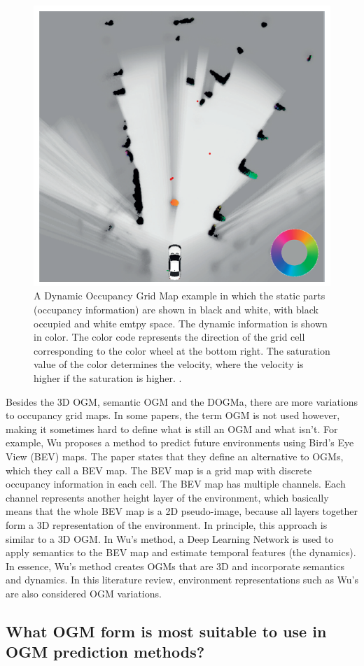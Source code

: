 \begin{figure}[h]
	\centering
	\includegraphics[width=0.4\linewidth]{Figures/Occupancy_Grid_Map/DOGMa_example}
	\caption{A Dynamic Occupancy Grid Map example in which the static parts (occupancy information) are shown in black and white, with black occupied and white emtpy space. The dynamic information is shown in color. The color code represents the direction of the grid cell corresponding to the color wheel at the bottom right. The saturation value of the color determines the velocity, where the velocity is higher if the saturation is higher. \cite{nuss2018random}.}
	\label{fig:DOGMa_example}
\end{figure}

Besides the 3D \gls{OGM}, semantic \gls{OGM} and the DOGMa, there are more variations to occupancy grid maps. In some papers, the term \gls{OGM} is not used however, making it sometimes hard to define what is still an \gls{OGM} and what isn't. 
For example, Wu \cite{wu2020motionnet} proposes a method to predict future environments using Bird's Eye View (BEV) maps. The paper states that they define an alternative to OGMs, which they call a BEV map. The BEV map is a grid map with discrete occupancy information in each cell. The BEV map has multiple channels. Each channel represents another height layer of the environment, which basically means that the whole BEV map is a 2D pseudo-image, because all layers together form a 3D representation of the environment. In principle, this approach is similar to a 3D \gls{OGM}. In Wu's method, a Deep Learning Network is used to apply semantics to the BEV map and estimate temporal features (the dynamics). In essence, Wu's method creates OGMs that are 3D and incorporate semantics and dynamics. In this literature review, environment representations such as Wu's are also considered \gls{OGM} variations. \\

\subsection{What OGM form is most suitable to use in OGM prediction methods?} \label{subsec:OGM_conclude}

